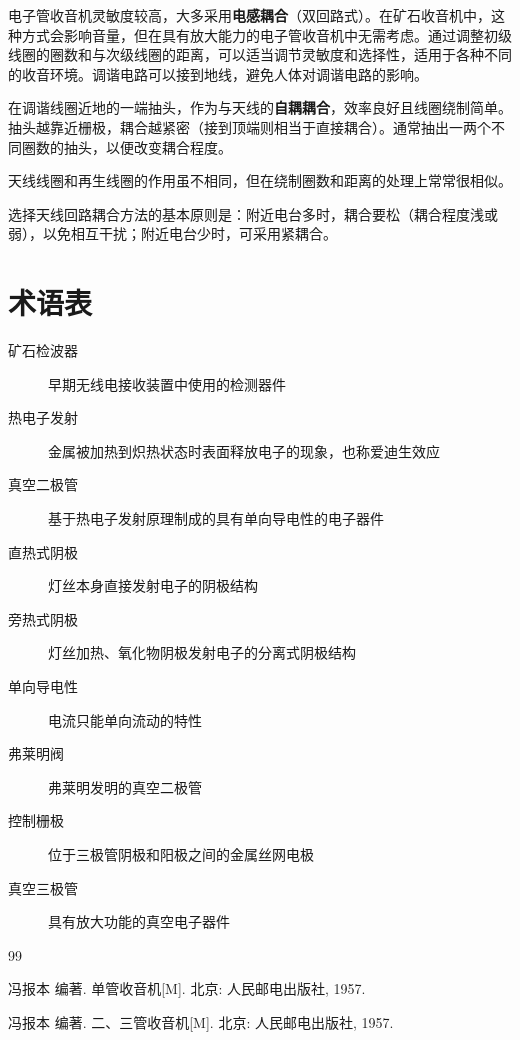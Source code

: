 \documentclass[12pt,UTF8]{ctexbook}
\begin{document}
电子管收音机灵敏度较高，大多采用\textbf{电感耦合}（双回路式）。在矿石收音机中，这种方式会影响音量，但在具有放大能力的电子管收音机中无需考虑。通过调整初级线圈的圈数和与次级线圈的距离，可以适当调节灵敏度和选择性，适用于各种不同的收音环境。调谐电路可以接到地线，避免人体对调谐电路的影响。

在调谐线圈近地的一端抽头，作为与天线的\textbf{自耦耦合}，效率良好且线圈绕制简单。抽头越靠近栅极，耦合越紧密（接到顶端则相当于直接耦合）。通常抽出一两个不同圈数的抽头，以便改变耦合程度。

天线线圈和再生线圈的作用虽不相同，但在绕制圈数和距离的处理上常常很相似。

选择天线回路耦合方法的基本原则是：附近电台多时，耦合要松（耦合程度浅或弱），以免相互干扰；附近电台少时，可采用紧耦合。

\chapter{术语表}

\begin{description}
    \item[矿石检波器] 早期无线电接收装置中使用的检测器件
    \item[热电子发射] 金属被加热到炽热状态时表面释放电子的现象，也称爱迪生效应
    \item[真空二极管] 基于热电子发射原理制成的具有单向导电性的电子器件
    \item[直热式阴极] 灯丝本身直接发射电子的阴极结构
    \item[旁热式阴极] 灯丝加热、氧化物阴极发射电子的分离式阴极结构
    \item[单向导电性] 电流只能单向流动的特性
    \item[弗莱明阀] 弗莱明发明的真空二极管
    \item[控制栅极] 位于三极管阴极和阳极之间的金属丝网电极
    \item[真空三极管] 具有放大功能的真空电子器件
\end{description}

\backmatter

\begin{thebibliography}{99}
\item 冯报本 编著. 单管收音机[M]. 北京: 人民邮电出版社, 1957.
\item 冯报本 编著. 二、三管收音机[M]. 北京: 人民邮电出版社, 1957.
\end{thebibliography}
\end{document}

